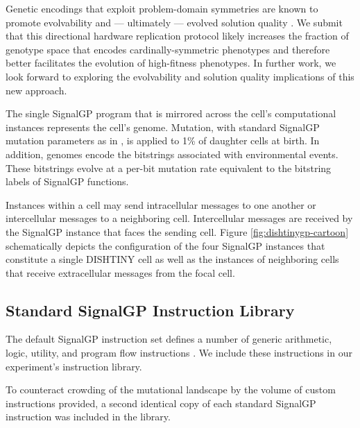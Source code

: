 Genetic encodings that exploit problem-domain symmetries are known to promote evolvability and --- ultimately --- evolved solution quality \cite{clune2011performance, cheney2014unshackling}.
We submit that this directional hardware replication protocol likely increases the fraction of genotype space that encodes cardinally-symmetric phenotypes and therefore better facilitates the evolution of high-fitness phenotypes.
In further work, we look forward to exploring the evolvability and solution quality implications of this new approach.

The single SignalGP program that is mirrored across the cell's computational instances represents the cell's genome.
Mutation, with standard SignalGP mutation parameters as in \cite{lalejini2018evolving}, is applied to 1\% of daughter cells at birth.
In addition, genomes encode the bitstrings associated with environmental events.
These bitstrings evolve at a per-bit mutation rate equivalent to the bitstring labels of SignalGP functions.

Instances within a cell may send intracellular messages to one another or intercellular messages to a neighboring cell.
Intercellular messages are received by the SignalGP instance that faces the sending cell.
Figure \ref{fig:dishtinygp-cartoon} schematically depicts the configuration of the four SignalGP instances that constitute a single DISHTINY cell as well as the instances of neighboring cells that receive extracellular messages from the focal cell.

\subsection{Standard SignalGP Instruction Library} \label{sup:standard_instruction_library}

The default SignalGP instruction set defines a number of generic arithmetic, logic, utility, and program flow instructions \cite{lalejini2018evolving}.
We include these instructions in our experiment's instruction library.

To counteract crowding of the mutational landscape by the volume of custom instructions provided, a second identical copy of each standard SignalGP instruction was included in the library.

